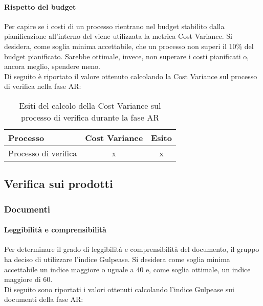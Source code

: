\documentclass[PianoDiQualifica.tex]{subfiles}
\begin{document}
			
			
		\paragraph{Rispetto del budget}
		
		Per capire se i costi di un processo rientrano nel budget stabilito dalla pianificazione all'interno del \PPdocRR{} viene utilizzata la metrica Cost Variance. Si desidera, come soglia minima accettabile, che un processo non superi il 10\% del budget pianificato. Sarebbe ottimale, invece, non superare i costi pianificati o, ancora meglio, spendere meno.\\
		Di seguito è riportato il valore ottenuto calcolando la Cost Variance sul processo di verifica nella fase AR:\\
		
		
		
		\begin{table}[h]
				\centering
				\begin{tabular}{l c c}
					\hline
					\rule[-0.3cm]{0cm}{0.8cm}
					\textbf{Processo} & \textbf{Cost Variance} & \textbf{Esito} \\
					\hline
					\rule[0cm]{0cm}{0.4cm}
					Processo di verifica & x & x \\
					\hline
				\end{tabular}
				\caption{Esiti del calcolo della Cost Variance sul processo di verifica durante la fase AR}
			\end{table}		
		
	
\subsection{Verifica sui prodotti}
	\subsubsection{Documenti}
		\paragraph{Leggibilità e comprensibilità}
		Per determinare il grado di leggibilità e comprensibilità del documento, il gruppo ha deciso di utilizzare l'indice Gulpease. Si desidera come soglia minima accettabile un indice
				maggiore o uguale a 40 e, come soglia ottimale, un indice maggiore di 60.\\
				Di seguito sono riportati i valori ottenuti calcolando l'indice Gulpease sui documenti della fase AR:
				
\end{document}
